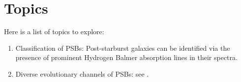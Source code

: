 \section{Topics}
Here is a list of topics to explore:
\begin{enumerate}
    \item Classification of PSBs: Post-starburst galaxies can be identified via the presence of prominent Hydrogen Balmer absorption lines in their spectra. 
    \item Diverse evolutionary channels of PSBs: see \citet{2019NatAs...3..440P}.
\end{enumerate}